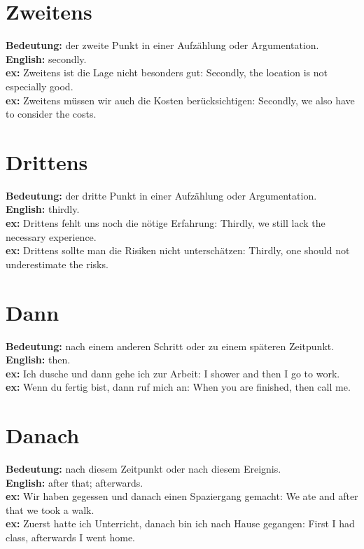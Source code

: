 \documentclass[a4paper]{article}
\begin{document}
    
    \section{Zweitens}
        \textbf{Bedeutung:} der zweite Punkt in einer Aufzählung oder Argumentation.\\
        \textbf{English:} secondly.\\
        \textbf{ex:} Zweitens ist die Lage nicht besonders gut: Secondly, the location is not especially good.\\
        \textbf{ex:} Zweitens müssen wir auch die Kosten berücksichtigen: Secondly, we also have to consider the costs.
    
    
    \section{Drittens}
        \textbf{Bedeutung:} der dritte Punkt in einer Aufzählung oder Argumentation.\\
        \textbf{English:} thirdly.\\
        \textbf{ex:} Drittens fehlt uns noch die nötige Erfahrung: Thirdly, we still lack the necessary experience.\\
        \textbf{ex:} Drittens sollte man die Risiken nicht unterschätzen: Thirdly, one should not underestimate the risks.
    
    
    \section{Dann}
        \textbf{Bedeutung:} nach einem anderen Schritt oder zu einem späteren Zeitpunkt.\\
        \textbf{English:} then.\\
        \textbf{ex:} Ich dusche und dann gehe ich zur Arbeit: I shower and then I go to work.\\
        \textbf{ex:} Wenn du fertig bist, dann ruf mich an: When you are finished, then call me.
    
    
    \section{Danach}
        \textbf{Bedeutung:} nach diesem Zeitpunkt oder nach diesem Ereignis.\\
        \textbf{English:} after that; afterwards.\\
        \textbf{ex:} Wir haben gegessen und danach einen Spaziergang gemacht: We ate and after that we took a walk.\\
        \textbf{ex:} Zuerst hatte ich Unterricht, danach bin ich nach Hause gegangen: First I had class, afterwards I went home.
    
\end{document}
